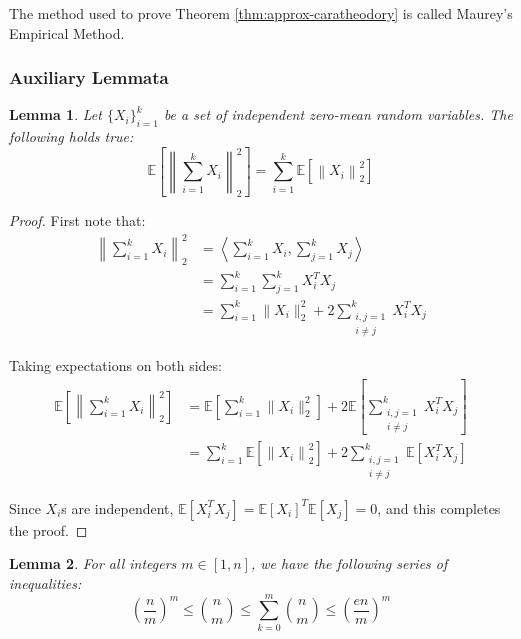 \documentclass{article}
\newtheorem{lemma}{Lemma}[subsection]
\theoremstyle{remark}
\newcommand{\Exp}{\mathbb{E}}
\newcommand{\inner}[2]{\left\langle #1, #2 \right\rangle}
\begin{document}
The method used to prove Theorem \ref{thm:approx-caratheodory} is called Maurey's Empirical Method.

\subsubsection{Auxiliary Lemmata}

\begin{lemma}
\label{lem:zero-mean-norm}
Let \(\{X_{i}\}_{i=1}^{k}\) be a set of independent zero-mean random variables. The following holds true:
\begin{equation*}
\Exp\left[\left\|\sum_{i=1}^{k}X_{i}\right\|_{2}^{2}\right] = \sum_{i=1}^{k}\Exp\left[\left\|X_{i}\right\|_{2}^{2}\right]
\end{equation*}
\end{lemma}

\begin{proof}
First note that:
\begin{align*}
\left\|\sum_{i=1}^{k}X_{i}\right\|_{2}^{2} &= \inner{\sum_{i=1}^{k}X_{i}}{\sum_{j=1}^{k}X_{j}} \\
&= \sum_{i=1}^{k}\sum_{j=1}^{k}X_{i}^{T}X_{j} \\
&= \sum_{i=1}^{k}\|X_{i}\|_{2}^{2} + 2\sum_{\substack{i, j = 1 \\ i \neq j}}^{k}X_{i}^{T}X_{j}
\end{align*}

Taking expectations on both sides:
\begin{align*}
\Exp\left[\left\|\sum_{i=1}^{k}X_{i}\right\|_{2}^{2}\right] &= \Exp\left[\sum_{i=1}^{k}\|X_{i}\|_{2}^{2}\right] + 2\Exp\left[\sum_{\substack{i, j = 1 \\ i \neq j}}^{k}X_{i}^{T}X_{j}\right] \\
&= \sum_{i=1}^{k}\Exp\left[\left\|X_{i}\right\|_{2}^{2}\right] + 2\sum_{\substack{i, j = 1 \\ i \neq j}}^{k} \Exp\left[X_{i}^{T}X_{j}\right]
\end{align*}

Since \(X_{i}\)s are independent, \(\Exp\left[X_{i}^{T}X_{j}\right] = \Exp\left[X_{i}\right]^{T}\Exp\left[X_{j}\right] = 0\), and this completes the proof.
\end{proof}

\begin{lemma}
For all integers \(m \in [1, n]\), we have the following series of inequalities:
\begin{equation*}
\left(\frac{n}{m}\right)^{m} \leq \binom{n}{m} \leq \sum_{k=0}^{m}\binom{n}{m} \leq \left(\frac{en}{m}\right)^{m}
\end{equation*}
\end{lemma}
\end{document}
